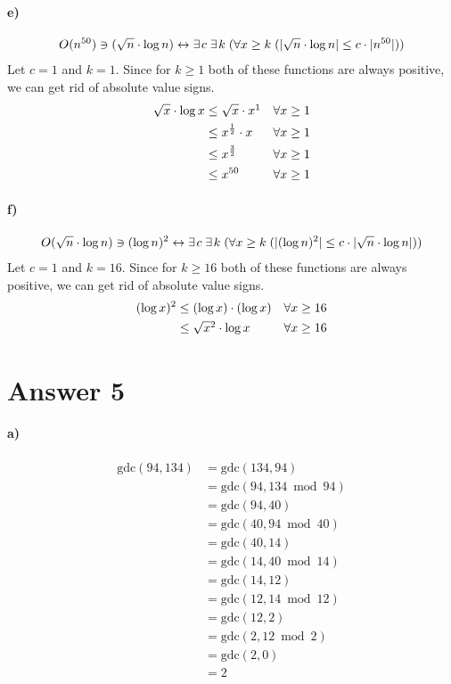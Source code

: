 \documentclass[12pt]{article}
\newcommand\+{\mkern2mu}
\begin{document}
\paragraph{e)}
\begin{gather*}
O(n^{50}) \ni (\sqrt{n} \cdot \log{n}) \leftrightarrow \exists \+ c \; \exists \+ k \; (\forall x \geq k \; (\vert \sqrt{n} \cdot \log{n} \vert \leq c \cdot \vert n^{50} \vert))
\end{gather*}
Let $c = 1$ and $k = 1$.
Since for $k \geq 1$ both of these functions are always positive, we can get rid of absolute value signs.
\begin{align*}
\sqrt{x} \cdot \log{x} &\leq \sqrt{x} \cdot x\footnotemark && \forall x \geq 1 \\
&\leq x^{\frac{1}{2}} \cdot x && \forall x \geq 1 \\
&\leq x^{\frac{3}{2}} && \forall x \geq 1 \\
&\leq x^{50} && \forall x \geq 1
\end{align*}
\paragraph{f)}
\begin{gather*}
O(\sqrt{n} \cdot \log{n}) \ni (\log{n})^2 \leftrightarrow \exists \+ c \; \exists \+ k \; (\forall x \geq k \; (\vert (\log{n})^2 \vert \leq c \cdot \vert \sqrt{n} \cdot \log{n} \vert))
\end{gather*}
Let $c = 1$ and $k = 16$.
Since for $k \geq 16$ both of these functions are always positive, we can get rid of absolute value signs.
\begin{align*}
(\log{x})^2 &\leq (\log{x}) \cdot (\log{x}) && \forall x \geq 16 \\
&\leq \sqrt{x}\footnotemark \cdot \log{x} && \forall x \geq 16
\end{align*}

\section*{Answer 5}
\paragraph{a)}
\begin{align*}
\text{gdc}(94, 134) &= \text{gdc}(134, 94) \\
&= \text{gdc}(94, 134 \bmod 94) \\
&= \text{gdc}(94, 40) \\
&= \text{gdc}(40, 94 \bmod 40) \\
&= \text{gdc}(40, 14) \\
&= \text{gdc}(14, 40 \bmod 14) \\
&= \text{gdc}(14, 12) \\
&= \text{gdc}(12, 14 \bmod 12) \\
&= \text{gdc}(12, 2) \\
&= \text{gdc}(2, 12 \bmod 2) \\
&= \text{gdc}(2, 0) \\
&= 2
\end{align*}
\end{document}
